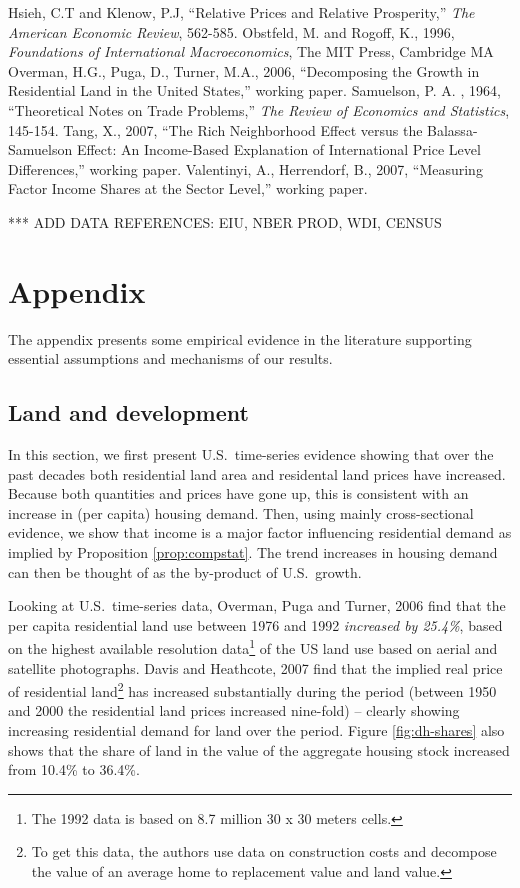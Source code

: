 \documentclass[12pt]{article}
\begin{document}
\begin{thebibliography}{99}
 Hsieh, C.T and Klenow, P.J, ``Relative Prices and
Relative Prosperity,'' \emph{The American Economic Review}, 562-585.
 Obstfeld, M. and Rogoff, K., 1996, \emph{Foundations of International Macroeconomics}, The MIT Press, Cambridge MA
 Overman, H.G., Puga, D., Turner, M.A., 2006, ``Decomposing the Growth in Residential Land in the United States,'' working paper.
 Samuelson, P. A. , 1964, ``Theoretical Notes on Trade Problems,'' \emph{The Review of Economics and Statistics}, 145-154.
\bibitem{} Tang, X., 2007, ``The Rich Neighborhood Effect versus the Balassa-Samuelson Effect: An Income-Based Explanation of International Price Level Differences,'' working paper.
 Valentinyi, A., Herrendorf, B., 2007, ``Measuring Factor Income Shares at the Sector Level,'' working paper.
\end{thebibliography}

*** ADD DATA REFERENCES: EIU, NBER PROD, WDI, CENSUS

\section{Appendix}

The appendix presents some empirical evidence in the literature supporting essential assumptions and mechanisms of our results.
 
\subsection{Land and development}
In this section, we first present U.S.~time-series evidence showing that over the past decades both residential land area and residental land prices have increased. Because both quantities and prices have gone up, this is consistent with an increase in (per capita) housing demand. Then, using mainly cross-sectional evidence, we show that income is a major factor influencing residential demand as implied by Proposition \ref{prop:compstat}. The trend increases in housing demand can then be thought of as the by-product of U.S.~growth.

Looking at U.S.~time-series data, Overman, Puga and Turner, 2006 find that the per capita residential land use between 1976 and 1992 \emph{increased by 25.4\%}, based on the highest available resolution data\footnote{The 1992 data is based on 8.7 million 30 x 30 meters cells.} of the US land use based on aerial and satellite photographs. Davis and Heathcote, 2007 find that the implied real price of residential land\footnote{To get this data, the authors use
data on construction costs and decompose the value of an
average home to replacement value and land value.} has increased substantially during the period (between 1950 and 2000 the residential land prices increased nine-fold) -- clearly showing increasing residential demand for land over the period. Figure \ref{fig:dh-shares} also shows that the share of land in the value of the aggregate housing stock increased from 10.4\% to 36.4\%.
\end{document}
